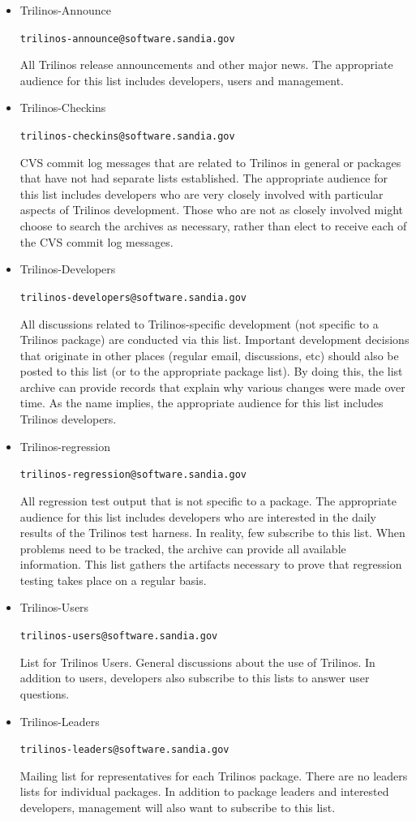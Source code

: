 \documentclass[12pt,relax]{article}
\newcommand{\InlineCommand}[1]{
  {\hspace{0.01 in}} {\tt #1} {\hspace{0.01 in}}}
\begin{document}
\begin{itemize}
\item Trilinos-Announce 
\InlineCommand{trilinos-announce@software.sandia.gov}

All Trilinos release announcements and other major news.  The appropriate 
audience for this list includes developers, users and management.

\item Trilinos-Checkins 
\InlineCommand{trilinos-checkins@software.sandia.gov}

CVS commit log messages that are related to Trilinos in general or packages 
that have not had separate lists established.  The appropriate audience for 
this list includes developers who are very closely involved with particular 
aspects of Trilinos development.  Those who are not as closely involved might 
choose to search the archives as necessary, rather than elect to receive 
each of the CVS commit log messages.

\item Trilinos-Developers 
\InlineCommand{trilinos-developers@software.sandia.gov}

All discussions related to Trilinos-specific development (not specific to a 
Trilinos package) are conducted via this list.  Important development 
decisions that originate in other places (regular email, discussions, etc) 
should also be posted to this list (or to the appropriate package list).  
By doing this, the list archive can provide records that explain why various 
changes were made over time.  As the name implies, the appropriate audience for
this list includes Trilinos developers.

\item Trilinos-regression 
\InlineCommand{trilinos-regression@software.sandia.gov}

All regression test output that is not specific to a package.  The appropriate 
audience for this list includes developers who are interested in the daily 
results of the Trilinos test harness.  In reality, few subscribe to this list.
When problems need to be tracked, the archive can provide all available 
information.  This list gathers the artifacts necessary to prove that 
regression testing takes place on a regular basis.

\item Trilinos-Users 
\InlineCommand{trilinos-users@software.sandia.gov}

List for Trilinos Users.  General discussions about the use of Trilinos.  In 
addition to users, developers also subscribe to this lists to answer user 
questions.

\item Trilinos-Leaders
\InlineCommand{trilinos-leaders@software.sandia.gov}

Mailing list for representatives for each Trilinos package.  There are no 
leaders lists for individual packages.  In addition to package leaders and 
interested developers, management will also want to subscribe to this list.
\end{itemize}
\end{document}
